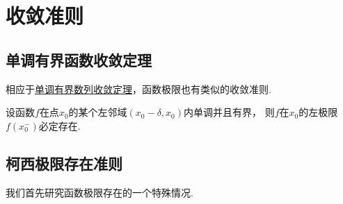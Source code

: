\section{收敛准则}
\subsection{单调有界函数收敛定理}
相应于\hyperref[theorem:极限.数列的单调有界定理]{单调有界数列收敛定理}，函数极限也有类似的收敛准则.
\begin{theorem}\label{theorem:极限.函数的单调有界定理}
设函数\(f\)在点\(x_0\)的某个左邻域\((x_0-\delta,x_0)\)内单调并且有界，
则\(f\)在\(x_0\)的左极限\(f(x_0^-)\)必定存在.
\end{theorem}

\subsection{柯西极限存在准则}
我们首先研究函数极限存在的一个特殊情况.

